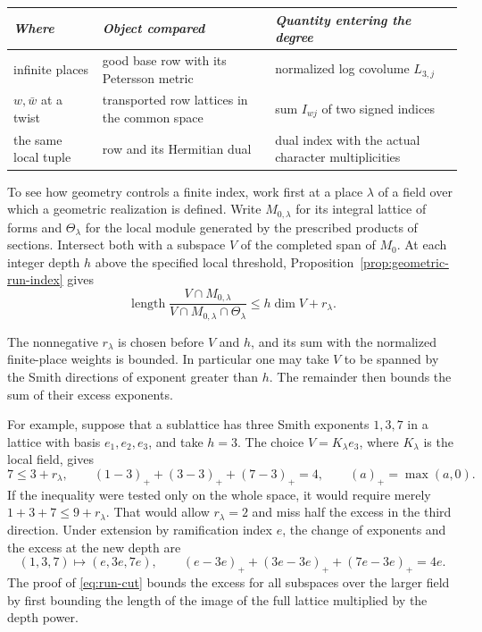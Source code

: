 \begin{construction}
\begin{tabular}{@{}>{\raggedright\arraybackslash}p{.25\linewidth}>{\raggedright\arraybackslash}p{.29\linewidth}>{\raggedright\arraybackslash}p{.38\linewidth}@{}}
\textit{Where} & \textit{Object compared} & \textit{Quantity entering the degree}\\ \hline
infinite places & good base row with its Petersson metric & normalized log covolume \(L_{3,j}\)\\
\(w,\bar w\) at a twist & transported row lattices in the common space & sum \(I_{wj}\) of two signed indices\\
the same local tuple & row and its Hermitian dual & dual index with the actual character multiplicities
\end{tabular}
\caption{Three terms in the determinant comparison at one lift. The two finite comparisons use the tuple assigned to the place and the common base rank \(D_0\).}\label{fig:intro-period-indices}
\end{construction}

To see how geometry controls a finite index, work first at a place \(\lambda\) of a field over which a geometric realization is defined. Write \(M_{0,\lambda}\) for its integral lattice of forms and \(\Theta_\lambda\) for the local module generated by the prescribed products of sections. Intersect both with a subspace \(V\) of the completed span of \(M_0\). At each integer depth \(h\) above the specified local threshold, Proposition~\ref{prop:geometric-run-index} gives
\[
 \operatorname{length}
 \frac{V\cap M_{0,\lambda}}{V\cap M_{0,\lambda}\cap\Theta_\lambda}
                         \le h\dim V+r_\lambda .
\]

The nonnegative \(r_\lambda\) is chosen before \(V\) and \(h\), and its sum with the normalized finite-place weights is bounded. In particular one may take \(V\) to be spanned by the Smith directions of exponent greater than \(h\). The remainder then bounds the sum of their excess exponents.

For example, suppose that a sublattice has three Smith exponents \(1,3,7\) in a lattice with basis \(e_1,e_2,e_3\), and take \(h=3\). The choice \(V=K_\lambda e_3\), where \(K_\lambda\) is the local field, gives
\[
      7\le3+r_\lambda,\qquad
       (1-3)_++(3-3)_++(7-3)_+=4,\qquad (a)_+=\max(a,0).
\]
If the inequality were tested only on the whole space, it would require merely \(1+3+7\le9+r_\lambda\). That would allow \(r_\lambda=2\) and miss half the excess in the third direction. Under extension by ramification index \(e\), the change of exponents and the excess at the new depth are
\[
        (1,3,7)\longmapsto(e,3e,7e),\qquad
        (e-3e)_++(3e-3e)_++(7e-3e)_+=4e .
\] 
The proof of \eqref{eq:run-cut} bounds the excess for all subspaces over the larger field by first bounding the length of the image of the full lattice multiplied by the depth power.


